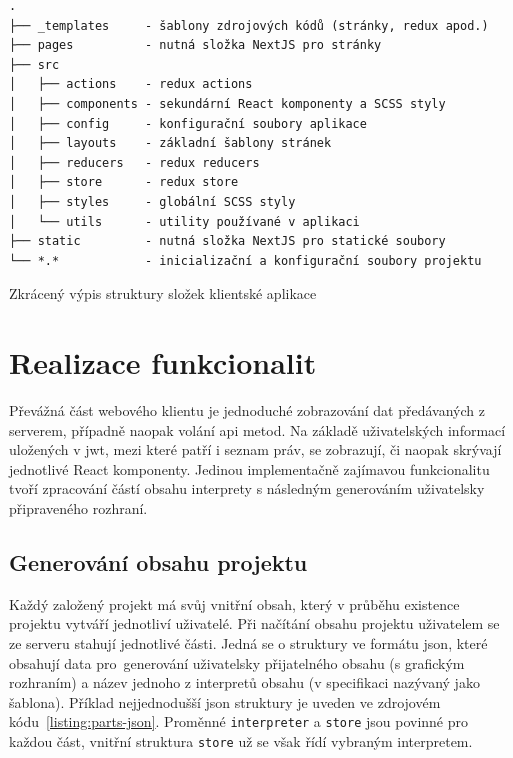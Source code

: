 \begin{fig:code}
	\begin{verbatim}
.
├── _templates     - šablony zdrojových kódů (stránky, redux apod.)
├── pages          - nutná složka NextJS pro stránky
├── src
│   ├── actions    - redux actions
│   ├── components - sekundární React komponenty a SCSS styly
│   ├── config     - konfigurační soubory aplikace
│   ├── layouts    - základní šablony stránek
│   ├── reducers   - redux reducers
│   ├── store      - redux store
│   ├── styles     - globální SCSS styly
│   └── utils      - utility používané v aplikaci
├── static         - nutná složka NextJS pro statické soubory
└── *.*            - inicializační a konfigurační soubory projektu
   \end{verbatim}
   \caption{Zkrácený výpis struktury složek klientské aplikace}\label{folders:client}
\end{fig:code}

   


\clearpage

\section{Realizace funkcionalit}

Převážná část webového klientu je jednoduché zobrazování dat předávaných z serverem, případně naopak volání \gls{api} metod. Na základě uživatelských informací uložených v \gls{jwt}, mezi které patří i seznam práv, se zobrazují, či naopak skrývají jednotlivé React komponenty. Jedinou implementačně zajímavou funkcionalitu tvoří zpracování částí obsahu interprety s následným generováním uživatelsky připraveného rozhraní.


\subsection{Generování obsahu projektu}
Každý založený projekt má svůj vnitřní obsah, který v průběhu existence projektu vytváří jednotliví uživatelé. Při načítání obsahu projektu uživatelem se ze serveru stahují jednotlivé části. Jedná se o struktury ve formátu \gls{json}, které obsahují data pro~generování uživatelsky přijatelného obsahu (s grafickým rozhraním) a název jednoho z interpretů obsahu (v specifikaci nazývaný jako šablona). Příklad nejjednodušší \gls{json} struktury je uveden ve zdrojovém kódu~\ref{listing:parts-json}. Proměnné \texttt{interpreter} a \texttt{store} jsou povinné pro každou část, vnitřní struktura \texttt{store} už se však řídí vybraným interpretem. 

